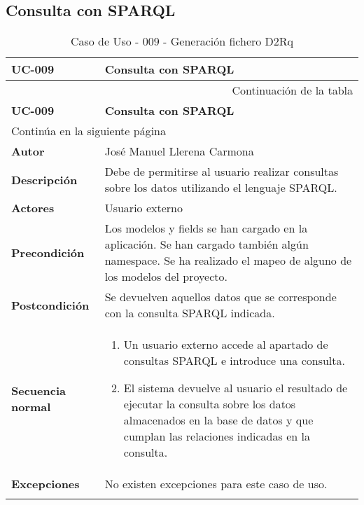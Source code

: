 \subsection{Consulta con SPARQL}

\begin{center}
\begin{longtable}{||p{3.4cm}|p{12cm}||}
 \hline \hline \bf UC-009 &  \bf Consulta con SPARQL \\
\hline
\endfirsthead
\hline \multicolumn{2}{|r|}{{Continuación de la tabla}} \\ \hline
 \hline \bf UC-009 &  \bf Consulta con SPARQL \\
\hline
\endhead
\hline \multicolumn{2}{|l|}{{Continúa en la siguiente página}} \\ \hline
\endfoot
\endlastfoot
 \hline \bf Autor & José Manuel Llerena Carmona \\
 \hline \bf Descripción & Debe de permitirse al usuario realizar consultas sobre
        los datos utilizando el lenguaje SPARQL.\\
 \hline \bf Actores & Usuario externo\\
 \hline \bf Precondición & Los modelos y fields se han cargado en la aplicación.
            Se han cargado también algún namespace. Se ha realizado el mapeo de
            alguno de los modelos del proyecto.\\
 \hline \bf Postcondición & Se devuelven aquellos datos que se corresponde con
            la consulta SPARQL indicada.\\
 \hline \bf Secuencia normal & 
             \begin{enumerate}
                \item Un usuario externo accede al apartado de consultas SPARQL
                      e introduce una consulta.
                \item El sistema devuelve al usuario el resultado de ejecutar la
                      consulta sobre los datos almacenados en la base de datos y
                      que cumplan las relaciones indicadas en la consulta.
             \end{enumerate}\\
 \hline \bf Excepciones & No existen excepciones para este caso de uso.\\
\hline
\hline
\caption{\label{tab:caso009} Caso de Uso - 009 - Generación fichero D2Rq} 
\end{longtable}
\end{center}


